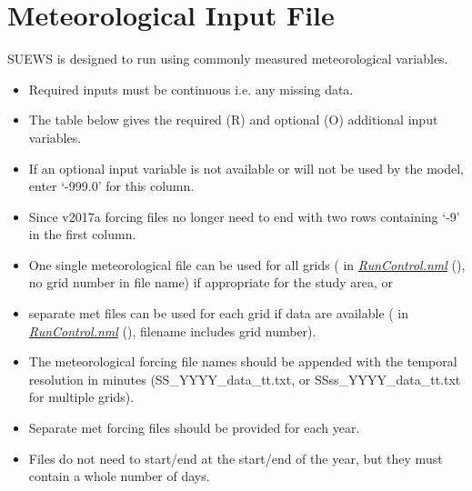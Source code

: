 \documentclass[letterpaper,10pt,english]{sphinxmanual}
\begin{document}
\section{Meteorological Input File}
\label{\detokenize{input_files/met_input::doc}}\label{\detokenize{input_files/met_input:meteorological-input-file}}
SUEWS is designed to run using commonly measured meteorological
variables.
\begin{itemize}
\item {} 
Required inputs must be continuous \textendash{} i.e.  any missing
data.

\item {} 
The table below gives the required (R) and optional (O) additional
input variables.

\item {} 
If an optional input variable is not available or will not be used by
the model, enter ‘-999.0’ for this column.

\item {} 
Since v2017a forcing files no longer need to end with two rows
containing ‘-9’ in the first column.

\item {} 
One single meteorological file can be used for all grids
( in {\hyperref[\detokenize{input_files/met_input:RunControl.nml}]{\emph{RunControl.nml}}} (), no
grid number in file name) if appropriate for the study area, or

\item {} 
separate met files can be used for each grid if data are available
( in {\hyperref[\detokenize{input_files/met_input:RunControl.nml}]{\emph{RunControl.nml}}} (),
filename includes grid number).

\item {} 
The meteorological forcing file names should be appended with the
temporal resolution in minutes (SS\_YYYY\_data\_tt.txt, or
SSss\_YYYY\_data\_tt.txt for multiple grids).

\item {} 
Separate met forcing files should be provided for each year.

\item {} 
Files do not need to start/end at the start/end of the year, but they
must contain a whole number of days.


\end{itemize}
\end{document}
